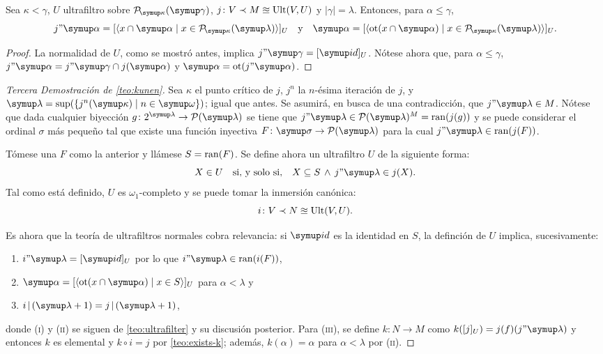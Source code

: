 \begin{teo}\label{teo:ultrafilter}
    Sea $\kappa<\gamma$, $U$ ultrafiltro sobre $\pwset[\kappa]{\gamma}$,
    $j\colon V\prec M\approxeq\operatorname{Ult}(V, U)$ y $|\gamma|=\lambda$. Entonces,
    para $\alpha\leq\gamma$,
    \[
        j"\alpha=[\seq{x\cap \alpha\mid x\in\pwset[\kappa]{\lambda}}]_U
        \quad\text{y}\quad
        \alpha = [\seq{\ot(x\cap \alpha)\mid x\in\pwset[\kappa]{\lambda}}]_U.
    \]
\end{teo}

\begin{proof}
La normalidad de $U$, como se mostró antes, implica $j"\gamma = [\id]_U$.
Nótese ahora que, para $\alpha\leq\gamma$, $j"\alpha=j"\gamma\cap j(\alpha)$
y $\alpha=\ot(j"\alpha)$.
\end{proof}

\begin{proof}[Tercera Demostración de \ref{teo:kunen}]
    \bgroup\sloppy
    Sea $\kappa$ el punto crítico de $j$, $j^n$ la $n$-ésima iteración de $j$,
    y $\lambda=\sup(\set{j^n(\kappa)\mid n\in\omega})$; igual que antes.
    Se asumirá, en busca de una contradicción, que $j"\lambda\in M$.
    Nótese que dada cualquier biyección $g\colon 2^\lambda\to\pwset{\lambda}$ se tiene que
    $j"\lambda\in\pwset{\lambda}^M = \ran(j(g))$ y se puede considerar el ordinal $\sigma$ más
    pequeño tal que existe una función inyectiva $F\colon\sigma\to\pwset{\lambda}$ para la cual
    $j"\lambda\in \ran(j(F))$.\par
    \egroup

    Tómese una $F$ como la anterior y llámese $S=\operatorname{ran}(F)$.
    Se define ahora un ultrafiltro $U$ de la siguiente forma:
    \[
        X\in U\quad\text{si, y solo si,}\quad X\subseteq S \,\land\, j"\lambda\in j(X).
    \]
    Tal como está definido, $U$ es $\omega_1$-completo y se puede tomar la inmersión canónica:
    \[
        i\colon V\prec N\approxeq\operatorname{Ult}(V, U).
    \]

    Es ahora que la teoría de ultrafiltros normales cobra relevancia: si $\id$
    es la identidad en $S$, la definción de $U$ implica, sucesivamente:
    \begin{enumerate}[label=(\roman*)]
        \item $i"\lambda = [\id]_U$ por lo que $i"\lambda\in\ran(i(F))$,
        \item $\alpha = [\seq{\ot(x\cap\alpha)\mid x\in S}]_U$ para $\alpha<\lambda$ y
        \item $i\rest(\lambda+1) = j\rest(\lambda+1)$,
    \end{enumerate}
    donde (\textsc{i}) y (\textsc{ii}) se siguen de \ref{teo:ultrafilter} y su discusión
    posterior. Para (\textsc{iii}), se define $k\colon N\to M$ como
    $k([j]_U) = j(f)(j"\lambda)$ y entonces $k$ es elemental y $k\circ i = j$
    por \ref{teo:exists-k}; además, $k(\alpha)=\alpha$ para $\alpha<\lambda$ por
    (\textsc{ii}).


\end{proof}
